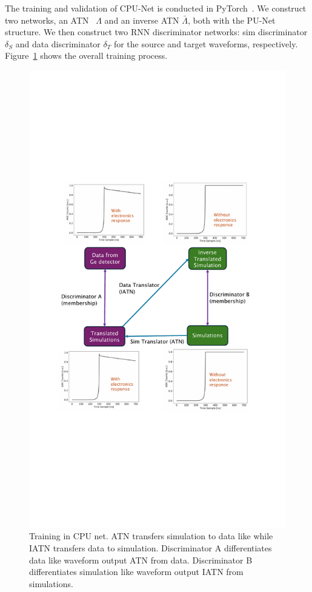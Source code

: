The training and validation of CPU-Net is conducted in PyTorch~\cite{pytorch}. We construct two networks, an ATN~ $\Lambda$ and an inverse ATN $\bar{\Lambda}$, both with the PU-Net structure. We then construct two RNN discriminator networks: sim discriminator $\delta_{S}$ and data discriminator $\delta_{T}$ for the source and target waveforms, respectively. Figure~\ref{fig:network_training} shows the overall training process.
\clearpage
\begin{figure}[htb!]
    \centering
    \includegraphics[width=0.99\linewidth,trim={5.5pc 20pc 6.3pc 19pc},clip]{ch7/figs/cycle_gan_training.pdf}
    \caption{Training in CPU net. ATN transfers simulation to data like while IATN transfers data to simulation. Discriminator A differentiates data like waveform output ATN from data. Discriminator B differentiates simulation like waveform output IATN from simulations.}
   \label{fig:network_training}
\end{figure}


